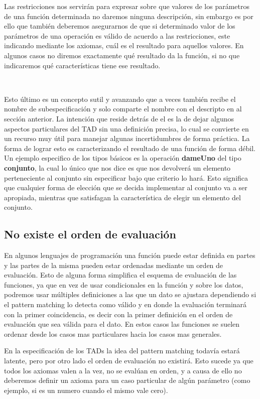 Las restricciones nos servir\'an para expresar sobre que valores de los par\'ametros de una funci\'on determinada no daremos ninguna descripci\'on, sin embargo es por ello que tambi\'en deberemos asegurarnos de que si determinado valor de los par\'ametros de una operaci\'on es v\'alido de acuerdo a las restricciones, este indicando mediante los axiomas, cu\'al es el resultado para aquellos valores. En algunos casos no diremos exactamente qu\'e resultado da la funci\'on, si no que indicaremos qu\'e caracter\'isticas tiene ese resultado.

~

Esto \'ultimo es un concepto sutil y avanzando que a veces tambi\'en recibe el nombre de subespecificaci\'on y solo comparte el nombre con el descripto en al secci\'on anterior. La intenci\'on que reside detr\'as de el es la de dejar algunos aspectos particulares del TAD sin una definici\'on precisa, lo cual se convierte en un recurso muy \'util para manejar algunas incertidumbres de forma pr\'actica. La forma de lograr esto es caracterizando el resultado de una funci\'on de forma d\'ebil. Un ejemplo especifico de los tipos b\'asicos es la operaci\'on \textbf{dameUno} del tipo \textbf{conjunto}, la cual lo \'unico que nos dice es que nos devolver\'a un elemento perteneciente al conjunto sin especificar bajo que criterio lo har\'a. Esto significa que cualquier forma de elecci\'on que se decida implementar al conjunto va a ser apropiada, mientras que satisfagan la caracter\'istica de elegir un elemento del conjunto.

\subsection{No existe el orden de evaluaci\'on}
En algunos lenguajes de programaci\'on una funci\'on puede estar definida en partes y las partes de la misma pueden estar ordenadas mediante un orden de evaluaci\'on. Esto de alguna forma simplifica el esquema de evaluaci\'on de las funciones, ya que en vez de usar condicionales en la funci\'on y sobre los datos, podremos usar m\'ultiples definiciones a las que un dato se ajustara dependiendo si el pattern matching lo detecta como v\'alido y en donde la evaluaci\'on terminar\'a con la primer coincidencia, es decir con la primer definici\'on en el orden de evaluaci\'on que sea v\'alida para el dato. En estos casos las funciones se suelen ordenar desde los casos mas particulares hacia los casos mas generales.

En la especificaci\'on de los TADs la idea del pattern matching todav\'ia estar\'a latente, pero por otro lado el orden de evaluaci\'on no existir\'a. Esto sucede ya que todos los axiomas valen a la vez, no se eval\'uan en orden, y a causa de ello no deberemos definir un axioma para un caso particular de alg\'un par\'ametro (como ejemplo, si es un numero cuando el mismo vale cero).

